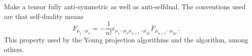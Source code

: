 
Make a tensor fully anti-symmetric as well as anti-selfdual. The
conventions used are that self-duality means
\begin{equation}
F_{\mu_1\cdots \mu_n}
= - \frac{1}{n!} \epsilon_{\mu_1\cdots\mu_n \mu_{n+1}\cdots \mu_{2n}} F_{\mu_{n+1}\cdots\mu_{2n}}\,.
\end{equation}
This property used by the Young projection algorithms and
the  algorithm, among others.

